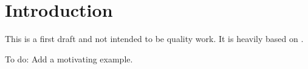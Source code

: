 \chapter{Introduction}

This is a first draft and not intended to be quality work. It is heavily based on \cite{polterovich}.

To do: Add a motivating example.
